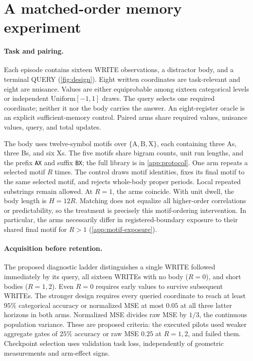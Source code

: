 \section{A matched-order memory experiment}
\label{sec:design}

\paragraph{Task and pairing.}
Each episode contains sixteen WRITE observations, a distractor body, and a terminal QUERY (\cref{fig:design}). Eight written coordinates are task-relevant and eight are nuisance. Values are either equiprobable among sixteen categorical levels or independent $\mathrm{Uniform}[-1,1]$ draws. The query selects one required coordinate; neither it nor the body carries the answer. An eight-register oracle is an explicit sufficient-memory control. Paired arms share required values, nuisance values, query, and total updates.

The body uses twelve-symbol motifs over $\{\mathrm A,\mathrm B,\mathrm X\}$, each containing three As, three Bs, and six Xs. The five motifs share bigram counts, unit run lengths, and the prefix \texttt{AX} and suffix \texttt{BX}; the full library is in \cref{app:protocol}. One arm repeats a selected motif $R$ times. The control draws motif identities, fixes its final motif to the same selected motif, and rejects whole-body proper periods. Local repeated substrings remain allowed. At $R=1$, the arms coincide. With unit dwell, the body length is $H=12R$. Matching does not equalize all higher-order correlations or predictability, so the treatment is precisely this motif-ordering intervention. In particular, the arms necessarily differ in registered-boundary exposure to their shared final motif for $R>1$ (\cref{app:motif-exposure}).

\paragraph{Acquisition before retention.}
The proposed diagnostic ladder distinguishes a single WRITE followed immediately by its query, all sixteen WRITEs with no body ($R=0$), and short bodies ($R=1,2$). Even $R=0$ requires early values to survive subsequent WRITEs. The stronger design requires every queried coordinate to reach at least $95\%$ categorical accuracy or normalized MSE at most $0.05$ at all three latter horizons in both arms. Normalized MSE divides raw MSE by $1/3$, the continuous population variance. These are proposed criteria: the executed pilots used weaker aggregate gates of $25\%$ accuracy or raw MSE $0.25$ at $R=1,2$, and failed them. Checkpoint selection uses validation task loss, independently of geometric measurements and arm-effect signs.

